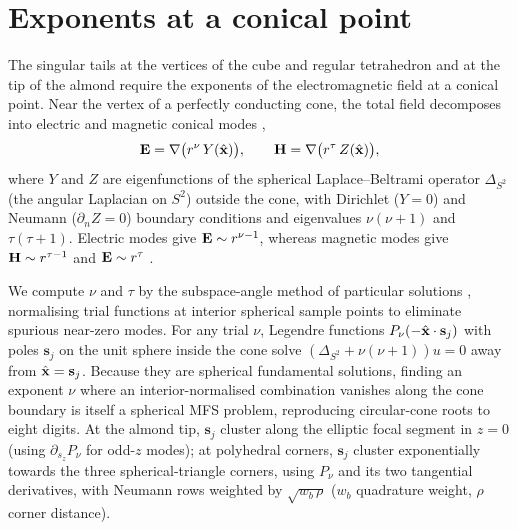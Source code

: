 \appendix
\renewcommand{\theHsection}{\Alph{section}}
\renewcommand{\theHtable}{\Alph{section}.\arabic{table}}
\renewcommand{\theHfigure}{\Alph{section}.\arabic{figure}}

\section{Exponents at a conical point}
\setcounter{table}{0}
\label{app:cone}

The singular tails at the vertices of the cube and regular tetrahedron and at the tip of the almond require the exponents of the electromagnetic field at a conical point. Near the vertex of a perfectly conducting cone, the total field decomposes into electric and magnetic conical modes \cite{vanbladel1996,desmedt1986,costabel2000},
\begin{equation}
  \mathbf{E} = \nabla\bigl(r^{\nu}\,Y(\hat{\mathbf{x}})\bigr), \qquad \mathbf{H} = \nabla\bigl(r^{\tau}\,Z(\hat{\mathbf{x}})\bigr),
\end{equation}
where $Y$ and $Z$ are eigenfunctions of the spherical Laplace--Beltrami operator $\Delta_{S^2}$ (the angular Laplacian on $S^2$) outside the cone, with Dirichlet ($Y = 0$) and Neumann ($\partial_n Z = 0$) boundary conditions and eigenvalues $\nu(\nu+1)$ and $\tau(\tau+1)$. Electric modes give $\mathbf{E}\sim r^{\nu-1}$, whereas magnetic modes give $\mathbf{H}\sim r^{\tau-1}$ and $\mathbf{E}\sim r^{\tau}$ \cite[Section 6.6]{costabel2000}.

We compute $\nu$ and $\tau$ by the subspace-angle method of particular solutions \cite{betcke2005}, normalising trial functions at interior spherical sample points to eliminate spurious near-zero modes. For any trial $\nu$, Legendre functions $P_\nu(-\hat{\mathbf{x}}\cdot\mathbf{s}_j)$ with poles $\mathbf{s}_j$ on the unit sphere inside the cone solve $(\Delta_{S^2}+\nu(\nu+1))u = 0$ away from $\hat{\mathbf{x}} = \mathbf{s}_j$. Because they are spherical fundamental solutions, finding an exponent $\nu$ where an interior-normalised combination vanishes along the cone boundary is itself a spherical MFS problem, reproducing circular-cone roots to eight digits. At the almond tip, $\mathbf{s}_j$ cluster along the elliptic focal segment in $z = 0$ (using $\partial_{s_z}P_\nu$ for odd-$z$ modes); at polyhedral corners, $\mathbf{s}_j$ cluster exponentially towards the three spherical-triangle corners, using $P_\nu$ and its two tangential derivatives, with Neumann rows weighted by $\sqrt{w_b\,\rho}$ ($w_b$ quadrature weight, $\rho$ corner distance).


